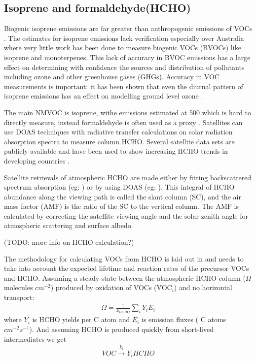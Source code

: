 \subsection{Isoprene and formaldehyde(HCHO)}

Biogenic isoprene emissions are far greater than anthropogenic emissions of VOCs \cite{Guenther_2006}. 
The estimates for isoprene emissions lack verification especially over Australia where very little work has been done to measure biogenic VOCs (BVOCs) like isoprene and monoterpenes.
This lack of accuracy in BVOC emissions has a large effect on determining with confidence the sources and distribution of pollutants including ozone and other greenhouse gases (GHGs).
Accuracy in VOC measurements is important: it has been shown that even the diurnal pattern of isoprene emissions has an effect on modelling ground level ozone \cite{Hewitt_2011}.

The main NMVOC is isoprene, withe emissions estimated at 500\tgyr \cite{Guenther_2006} which is hard to directly measure, instead formaldehyde is often used as a proxy \cite{Marais_2012,bauwens2013satellite}.
Satellites can use DOAS techniques with radiative transfer calculations on solar radiation absorption spectra to measure column HCHO.
Several satellite data sets are publicly available and have been used to show increasing HCHO trends in developing countries \cite{Mahajan_2015}.

Satellite retrievals of atmospheric HCHO are made either by fitting backscattered spectrum absorption (eg: \citet{Chance_2000}) or by using DOAS (eg: \citet{leue_2001}).
This integral of HCHO abundance along the viewing path is called the slant column (SC), and the air mass factor (AMF) is the ratio of the SC to the vertical column.
The AMF is calculated by correcting the satellite viewing angle and the solar zenith angle for atmospheric scattering and surface albedo.

(TODO: more info on HCHO calculation?)

The methodology for calculating VOCs from HCHO is laid out in \citet{Palmer_2003} and needs to take into account the expected lifetime and reaction rates of the precursor VOCs and HCHO.
Assuming a steady state between the atmospheric HCHO column ($\Omega$ molecules $cm^{-2}$)  produced by oxidation of VOCs (VOC$_i$) and no horizontal transport:
\begin{eqnarray*}
\Omega = \frac{1}{k_{HCHO}} \sum_{i} Y_i E_i
\end{eqnarray*}
where $Y_i$ is HCHO yields per C atom and $E_i$ is emission fluxes ( C atoms $cm^{-2}s^{-1}$).
And assuming HCHO is produced quickly from short-lived intermediates we get
\begin{eqnarray*}
VOC \overset{k_i}{\rightarrow} Y_i HCHO
\end{eqnarray*}

